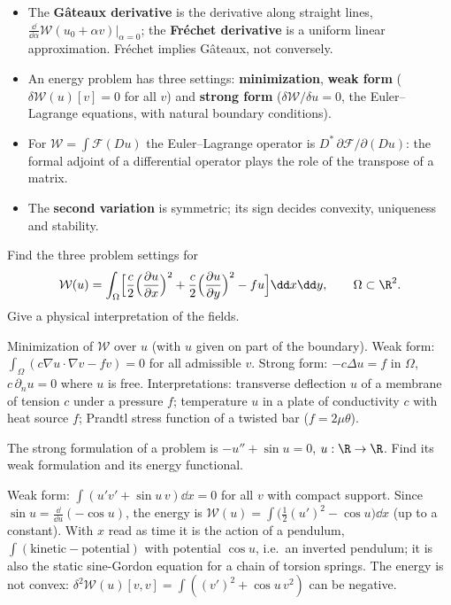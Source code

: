 \begin{gbox*}
\begin{itemize}
  \item The \textbf{G\^ateaux derivative} is the derivative along straight
  lines, $\frac{\dd}{\dd\alpha}\mathcal W(u_0+\alpha v)|_{\alpha=0}$; the
  \textbf{Fr\'echet derivative} is a uniform linear approximation. Fr\'echet
  implies G\^ateaux, not conversely.
  \item An energy problem has three settings: \textbf{minimization},
  \textbf{weak form} ($\delta\mathcal W(u)[v]=0$ for all $v$) and
  \textbf{strong form} ($\delta\mathcal W/\delta u=0$, the Euler--Lagrange
  equations, with natural boundary conditions).
  \item For $\mathcal W=\int\mathcal F(Du)$ the Euler--Lagrange operator is
  $D^\ast\,\partial\mathcal F/\partial(Du)$: the formal adjoint of a
  differential operator plays the role of the transpose of a matrix.
  \item The \textbf{second variation} is symmetric; its sign decides
  convexity, uniqueness and stability.
\end{itemize}
\end{gbox*}


\label{exo:A-membrane}
Find the three problem settings for
\[
  \mathcal W(u)=\int_\Omega\Bigl[\frac c2\Bigl(\frac{\partial u}{\partial x}\Bigr)^2
  +\frac c2\Bigl(\frac{\partial u}{\partial y}\Bigr)^2-fu\Bigr]\dd x\dd y,
  \qquad\Omega\subset\R^2 .
\]
Give a physical interpretation of the fields.
\begin{solution}
Minimization of $\mathcal W$ over $u$ (with $u$ given on part of the boundary).
Weak form: $\int_\Omega(c\nabla u\cdot\nabla v-fv)=0$ for all admissible $v$.
Strong form: $-c\Delta u=f$ in $\Omega$, $c\,\partial_nu=0$ where $u$ is free.
Interpretations: transverse deflection $u$ of a membrane of tension $c$ under
a pressure $f$; temperature $u$ in a plate of conductivity $c$ with heat
source $f$; Prandtl stress function of a twisted bar ($f=2\mu\theta$).
\end{solution}

\label{exo:A-pendulum}
The strong formulation of a problem is $-u''+\sin u=0$,
$u:\R\to\R$. Find its weak formulation and its energy functional.
\begin{solution}
Weak form: $\int(u'v'+\sin u\,v)\dd x=0$ for all $v$ with compact support.
Since $\sin u=\frac{\dd}{\dd u}(-\cos u)$, the energy is
$\mathcal W(u)=\int\bigl(\tfrac12(u')^2-\cos u\bigr)\dd x$ (up to a constant).
With $x$ read as time it is the action of a pendulum,
$\int(\text{kinetic}-\text{potential})$ with potential $\cos u$, i.e.\ an inverted
pendulum; it is also the static sine-Gordon equation for a chain of torsion
springs. The energy is not convex: $\delta^2\mathcal W(u)[v,v]=\int((v')^2+\cos u\,v^2)$
can be negative.
\end{solution}

